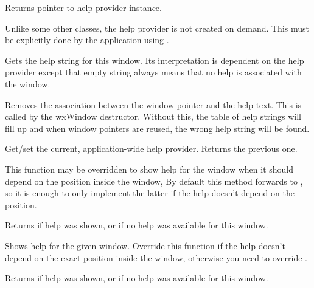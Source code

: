 Returns pointer to help provider instance.

Unlike some other classes, the help provider is not created on demand.
This must be explicitly done by the application using
.


\label{wxhelpprovidergethelp}


Gets the help string for this window. Its interpretation is dependent on the help provider
except that empty string always means that no help is associated with
the window.


\label{wxhelpproviderremovehelp}


Removes the association between the window pointer and the help text. This is
called by the wxWindow destructor. Without this, the table of help strings will
fill up and when window pointers are reused, the wrong help string will be
found.


\label{wxhelpproviderset}


Get/set the current, application-wide help provider. Returns
the previous one.


\label{wxhelpprovidershowhelpatpoint}


This function may be overridden to show help for the window when it should
depend on the position inside the window, By default this method forwards to 
, so it is enough to only implement
the latter if the help doesn't depend on the position.

Returns \true if help was shown, or \false if no help was available for this
window.







\label{wxhelpprovidershowhelp}


Shows help for the given window. Override this function if the help doesn't
depend on the exact position inside the window, otherwise you need to override 
.

Returns \true if help was shown, or \false if no help was available for this
window.

